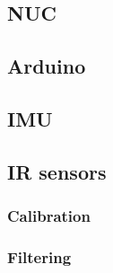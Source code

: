 \subsection{NUC}
\subsection{Arduino}
\subsection{IMU}
\subsection{IR sensors}
\subsubsection{Calibration}
\subsubsection{Filtering}